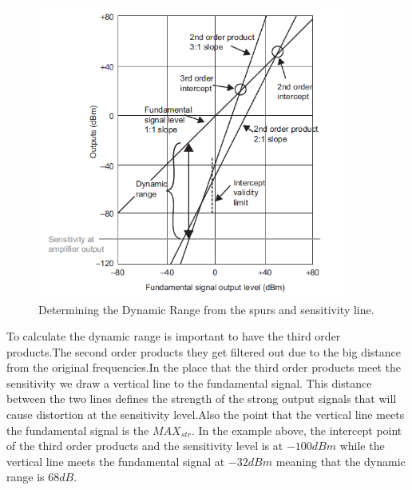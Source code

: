 \begin{figure}[H]
\centering
\includegraphics[width=0.90\textwidth]{figures/Dynamic_range_calc.png}
\caption{Determining the Dynamic Range from the spurs and sensitivity line.}
\label{Dynamic_range_calc}
\end{figure}
To calculate the dynamic range is important to have the third order products.The second order products they get filtered out due to the big distance from the original frequencies.In the place that the third order products meet the sensitivity we draw a vertical line to the fundamental signal.
This distance between the two lines defines the strength of the strong output signals that will cause distortion at the sensitivity level.Also the point that the vertical line meets the fundamental signal is the $MAX_{str}$. In the example above, the intercept point of the third order products and the sensitivity level is at $-100dBm$ while the vertical line meets the fundamental signal at $-32dBm$ meaning that the dynamic range is $68dB$. 




